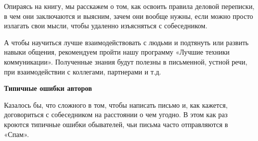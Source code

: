 Опираясь на книгу, мы расскажем о том, как освоить правила деловой переписки, в чем они заключаются и выясним, зачем они вообще нужны, если можно просто излагать свои мысли, чтобы удаленно изъясняться с собеседником.

А чтобы научиться лучше взаимодействовать с людьми и подтянуть или развить навыки общения, рекомендуем пройти нашу программу «Лучшие техники коммуникации». Полученные знания будут полезны в письменной, устной речи, при взаимодействии с коллегами, партнерами и т.д.

\textbf{Типичные ошибки авторов}

Казалось бы, что сложного в том, чтобы написать письмо и, как кажется, договориться с собеседником на расстоянии о чем угодно. В этом как раз кроются типичные ошибки обывателей, чьи письма часто отправляются в «Спам».

